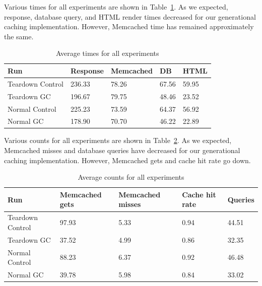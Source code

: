 \documentclass[12pt]{ucthesis}
\begin{document}
Various times for all experiments are shown in Table~\ref{tab:averageExperimentTimes}.
As we expected, response, database query, and HTML render times decreased for our generational caching implementation.
However, \textsf{Memcached} time has remained approximately the same.

\begin{table}[h]
\begin{center}
\begin{tabular}{| l | l | l | l | l |}
   \hline
   Run & Response & Memcached & DB & HTML \\ \hline
   Teardown Control & 236.33 & 78.26 & 67.56 & 59.95 \\ \hline
   Teardown GC & 196.67 & 79.75 & 48.46 & 23.52 \\ \hline
   \hline
   Normal Control & 225.23 & 73.59 & 64.37 & 56.92 \\ \hline
   Normal GC & 178.90 & 70.70 & 46.22 & 22.89 \\
   \hline
\end{tabular}
\end{center}
\caption{Average times for all experiments}
\label{tab:averageExperimentTimes}
\end{table}

Various counts for all experiments are shown in Table~\ref{tab:averageExperimentCounts}.
As we expected, \textsf{Memcached} misses and database queries have decreased for our generational caching implementation.
However, \textsf{Memcached} gets and cache hit rate go down.

\begin{table}[h]
\begin{center}
\begin{tabular}{| l | l | l | l | l |}
   \hline
   Run & Memcached gets & Memcached misses & Cache hit rate & Queries \\ \hline
   Teardown Control & 97.93 & 5.33 & 0.94 & 44.51 \\ \hline
   Teardown GC & 37.52 & 4.99 & 0.86 & 32.35 \\ \hline
   \hline
   Normal Control & 88.23 & 6.37 & 0.92 & 46.48 \\ \hline
   Normal GC & 39.78 & 5.98 & 0.84 & 33.02 \\
   \hline
\end{tabular}
\end{center}
\caption{Average counts for all experiments}
\label{tab:averageExperimentCounts}
\end{table}
\end{document}
